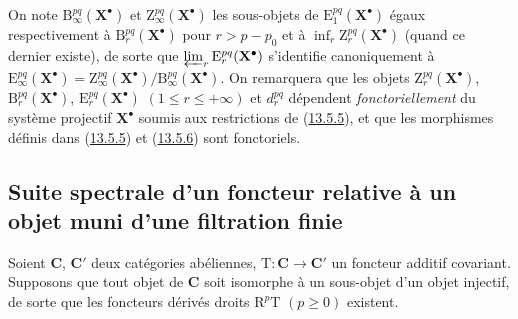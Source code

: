 \begin{env}[13.5.7]
\label{0.13.5.7-fr}
On note $\mathrm B_\infty^{pq}(\mathbf X^\bullet)$ et
$\mathrm Z_\infty^{pq}(\mathbf X^\bullet)$ les sous-objets de
$\mathrm E_1^{pq}(\mathbf X^\bullet)$ égaux respectivement à
$\mathrm B_r^{pq}(\mathbf X^\bullet)$ pour $r>p-p_0$ et à
$\inf_r\mathrm Z_r^{pq}(\mathbf X^\bullet)$ (quand ce dernier existe), de
sorte que $\varprojlim_r\mathrm E_r^{pq}(\mathbf X^\bullet)$
s'identifie canoniquement à
$\mathrm E_\infty^{pq}(\mathbf X^\bullet)=
\mathrm Z_\infty^{pq}(\mathbf X^\bullet)/
\mathrm B_\infty^{pq}(\mathbf X^\bullet)$. On remarquera que les objets
$\mathrm Z_r^{pq}(\mathbf X^\bullet)$,
$\mathrm B_r^{pq}(\mathbf X^\bullet)$,
$\mathrm E_r^{pq}(\mathbf X^\bullet)$ $(1\leq r\leq+\infty)$ et
$d_r^{pq}$ dépendent \emph{fonctoriellement} du système projectif
$\mathbf X^\bullet$ soumis aux restrictions de
(\hyperref[0.13.5.5-fr]{13.5.5}), et que les morphismes définis dans
(\hyperref[0.13.5.5-fr]{13.5.5}) et
(\hyperref[0.13.5.6-fr]{13.5.6}) sont fonctoriels.
\end{env}

\subsection{Suite spectrale d'un foncteur relative à un objet muni d'une filtration finie}
\label{subsection:0.13.6-fr}

\begin{env}[13.6.1]
\label{0.13.6.1-fr}
Soient $\boldsymbol{C}$, $\boldsymbol{C}'$ deux catégories abéliennes, $\mathrm T:\boldsymbol{C}\to \boldsymbol{C}'$ un
foncteur additif covariant. Supposons que tout objet de $\boldsymbol{C}$ soit isomorphe
à un sous-objet d'un objet injectif, de sorte que les foncteurs dérivés
droits $\mathrm R^p\mathrm T$ $(p\geq0)$ existent.
\end{env}

